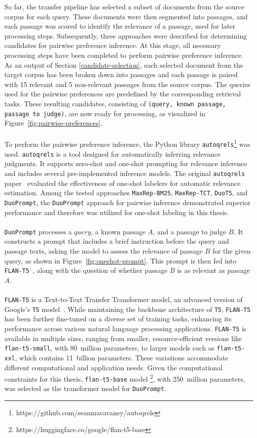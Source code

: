 So far, the transfer pipeline has selected a subset of documents from the source corpus for each query. These documents were then segmented into passages, and each passage was scored to identify the relevance of a passage, used for later processing steps. Subsequently, three approaches were described for determining candidates for pairwise preference inference. At this stage, all necessary processing steps have been completed to perform pairwise preference inference. As an output of Section \ref{candidate-selection}, each selected document from the target corpus has been broken down into passages and each passage is paired with 15 relevant and 5 non-relevant passages from the source corpus. The queries used for the pairwise preferences are predefined by the corresponding retrieval tasks. These resulting candidates, consisting of \texttt{(query, known passage, passage to judge)}, are now ready for processing, as visualized in Figure~\ref{fig:pairwise-preferences}.
\\\\
To perform the pairwise preference inference, the Python library \texttt{autoqrels}\footnote{https://github.com/seanmacavaney/autoqrels} was used. \texttt{autoqrels} is a tool designed for automatically inferring relevance judgments. It supports zero-shot and one-shot prompting for relevance inference and includes several pre-implemented inference models. The original \texttt{autoqrels} paper~\citep{macavaney:2023} evaluated the effectiveness of one-shot labelers for automatic relevance estimation. Among the tested approaches \texttt{MaxRep-BM25}, \texttt{MaxRep-TCT}, \texttt{DuoT5}, and \texttt{DuoPrompt}, the \texttt{DuoPrompt} approach for pairwise inference demonstrated superior performance and therefore was utilized for one-shot labeling in this thesis.
\\\\
\texttt{DuoPrompt} processes a $query$, a known passage $A$, and a passage to judge $B$. It constructs a prompt that includes a brief instruction before the query and passage texts, asking the model to assess the relevance of passage $B$ for the given query, as shown in Figure~\ref{fig:oneshot-prompt}. This prompt is then fed into \mbox{\texttt{FLAN-T5}~\citep{chung:2022}}, along with the question of whether passage $B$ is as relevant as passage $A$.
\\\\
\texttt{FLAN-T5} is a Text-to-Text Transfer Transformer model, an advanced version of Google's \texttt{T5} model~\citep{raffel:2020}. While maintaining the backbone architecture of \texttt{T5}, \texttt{FLAN-T5} has been further fine-tuned on a diverse set of training tasks, enhancing its performance across various natural language processing applications. \texttt{FLAN-T5} is available in multiple sizes, ranging from smaller, resource-efficient versions like \texttt{flan-t5-small}, with 80~million parameters, to larger models such as \texttt{flan-t5-xxl}, which contains 11~billion parameters. These variations accommodate different computational and application needs. Given the computational constraints for this thesis, \texttt{flan-t5-base} model \footnote{https://huggingface.co/google/flan-t5-base}, with 250~million parameters, was selected as the transformer model for \texttt{DuoPrompt}.
